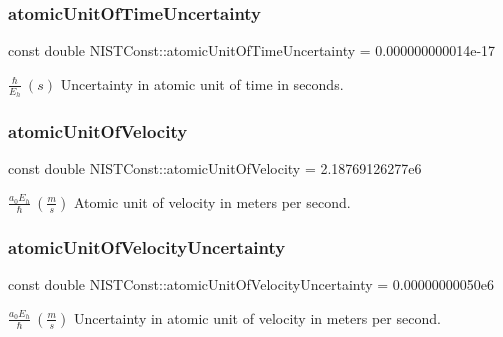 \subsubsection{\texorpdfstring{atomic\+Unit\+Of\+Time\+Uncertainty}{atomicUnitOfTimeUncertainty}}
{\footnotesize\ttfamily const double N\+I\+S\+T\+Const\+::atomic\+Unit\+Of\+Time\+Uncertainty = 0.\+000000000014e-\/17}

$\frac{\hbar}{E_h} \ (s)$ Uncertainty in atomic unit of time in seconds. \mbox{\label{group___n_i_s_t_const-_atomic_unit_gaf22e630a5412176c4d94dbc8b1e36f70}} 
\subsubsection{\texorpdfstring{atomic\+Unit\+Of\+Velocity}{atomicUnitOfVelocity}}
{\footnotesize\ttfamily const double N\+I\+S\+T\+Const\+::atomic\+Unit\+Of\+Velocity = 2.\+18769126277e6}

$\frac{a_0 E_h}{\hbar} \ (\frac{m}{s})$ Atomic unit of velocity in meters per second. \mbox{\label{group___n_i_s_t_const-_atomic_unit_ga519034dfac791b4fd441640dd6859c2e}} 
\subsubsection{\texorpdfstring{atomic\+Unit\+Of\+Velocity\+Uncertainty}{atomicUnitOfVelocityUncertainty}}
{\footnotesize\ttfamily const double N\+I\+S\+T\+Const\+::atomic\+Unit\+Of\+Velocity\+Uncertainty = 0.\+00000000050e6}

$\frac{a_0 E_h}{\hbar} \ (\frac{m}{s})$ Uncertainty in atomic unit of velocity in meters per second. 